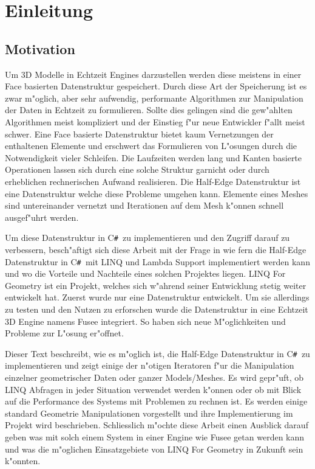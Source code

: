 \documentclass[pagesize, paper=a4, fontsize=12pt,titlepage=true, headings=small, headnosepline, abstractoff, liststotoc, nochapterprefix, plainheadsepline]{scrreprt}
\newcommand{\CSS}{C\texttt{\# }}
\newcommand{\LFGS}{LINQ For Geometry }
\newcommand{\HES}{Half-Edge Datenstruktur }
\begin{document}

\chapter {Einleitung}
	\section {Motivation}
Um 3D Modelle in Echtzeit Engines darzustellen werden diese meistens in einer Face basierten Datenstruktur gespeichert. Durch diese Art der Speicherung ist es zwar m"oglich, aber sehr aufwendig, performante Algorithmen zur Manipulation der Daten in Echtzeit zu formulieren. Sollte dies gelingen sind die gew"ahlten Algorithmen meist kompliziert und der Einstieg f"ur neue Entwickler f"allt meist schwer. Eine Face basierte Datenstruktur bietet kaum Vernetzungen der enthaltenen Elemente und erschwert das Formulieren von L"osungen durch die Notwendigkeit vieler Schleifen. Die Laufzeiten werden lang und Kanten basierte Operationen lassen sich durch eine solche Struktur garnicht oder durch erheblichen rechnerischen Aufwand realisieren. Die \HES ist eine Datenstruktur welche diese Probleme umgehen kann. Elemente eines Meshes sind untereinander vernetzt und Iterationen auf dem Mesh k"onnen schnell ausgef"uhrt werden.
\newline

Um diese Datenstruktur in \CSS zu implementieren und den Zugriff darauf zu verbessern, besch"aftigt sich diese Arbeit mit der Frage in wie fern die \HES in \CSS mit LINQ und Lambda Support implementiert werden kann und wo die Vorteile und Nachteile eines solchen Projektes liegen. \LFGS ist ein Projekt, welches sich w"ahrend seiner Entwicklung stetig weiter entwickelt hat. Zuerst wurde nur eine Datenstruktur entwickelt. Um sie allerdings zu testen und den Nutzen zu erforschen wurde die Datenstruktur in eine Echtzeit 3D Engine namens Fusee integriert. So haben sich neue M"oglichkeiten und Probleme zur L"osung er"offnet.
\newline

Dieser Text beschreibt, wie es m"oglich ist, die \HES in \CSS zu implementieren und zeigt einige der n"otigen Iteratoren f"ur die Manipulation einzelner geometrischer Daten oder ganzer Models/Meshes. Es wird gepr"uft, ob LINQ Abfragen in jeder Situation verwendet werden k"onnen oder ob mit Blick auf die Performance des Systems mit Problemen zu rechnen ist. Es werden einige standard Geometrie Manipulationen vorgestellt und ihre Implementierung im Projekt wird beschrieben. Schliesslich m"ochte diese Arbeit einen Ausblick darauf geben was mit solch einem System in einer Engine wie Fusee getan werden kann und was die m"oglichen Einsatzgebiete von \LFGS in Zukunft sein k"onnten.
\newline
\end{document}
